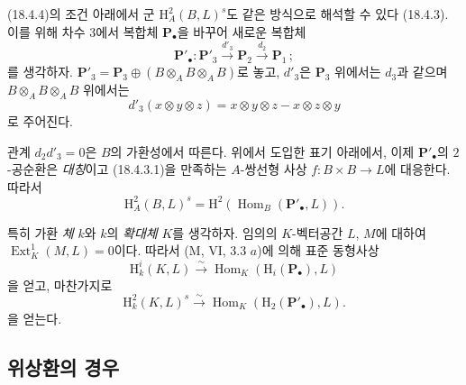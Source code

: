 \begin{env}[18.4.5]
\label{0.18.4.5-fr}
(18.4.4)의 조건 아래에서 군 $\mathrm H_A^2(B,L)^s$도 같은 방식으로
해석할 수 있다 (18.4.3). 이를 위해 차수 $3$에서 복합체
$\mathbf P_\bullet$을 바꾸어 새로운 복합체
\[
  \mathbf P'_\bullet:\mathbf P'_3\xrightarrow{d'_3}\mathbf P_2
  \xrightarrow{d_2}\mathbf P_1\,;
\]
를 생각하자. $\mathbf P'_3=\mathbf P_3\oplus
(B\otimes_A B\otimes_A B)$로 놓고, $d'_3$은 $\mathbf P_3$ 위에서는
$d_3$과 같으며 $B\otimes_A B\otimes_A B$ 위에서는
\[
  d'_3(x\otimes y\otimes z)=x\otimes y\otimes z-x\otimes z\otimes y
\]
로 주어진다.

관계 $d_2d'_3=0$은 $B$의 가환성에서 따른다. 위에서 도입한 표기
아래에서, 이제 $\mathbf P'_\bullet$의 $2$-공순환은
\emph{대칭}이고 (18.4.3.1)을 만족하는 $A$-쌍선형 사상
$f:B\times B\to L$에 대응한다. 따라서
\[
  \mathrm H_A^2(B,L)^s
  =\mathrm H^2(\operatorname{Hom}_B(\mathbf P'_\bullet,L)).
\]
\end{env}

\begin{env}[18.4.6]
\label{0.18.4.6-fr}
특히 가환 \emph{체} $k$와 $k$의 \emph{확대체} $K$를 생각하자.
임의의 $K$-벡터공간 $L$, $M$에 대하여
$\operatorname{Ext}_K^1(M,L)=0$이다. 따라서 (M, VI, 3.3 $a$)에 의해
표준 동형사상
\begin{equation}
\label{0.18.4.6.1-fr}
\tag{18.4.6.1}
  \mathrm H_k^i(K,L)\xrightarrow{\sim}
  \operatorname{Hom}_K(\mathrm H_i(\mathbf P_\bullet),L)
\end{equation}
을 얻고, 마찬가지로
\begin{equation}
\label{0.18.4.6.2-fr}
\tag{18.4.6.2}
  \mathrm H_k^2(K,L)^s\xrightarrow{\sim}
\operatorname{Hom}_K(\mathrm H_2(\mathbf P'_\bullet),L).
\end{equation}
을 얻는다.
\end{env}

\subsection{위상환의 경우}
\label{subsection:0.18.5-fr}

